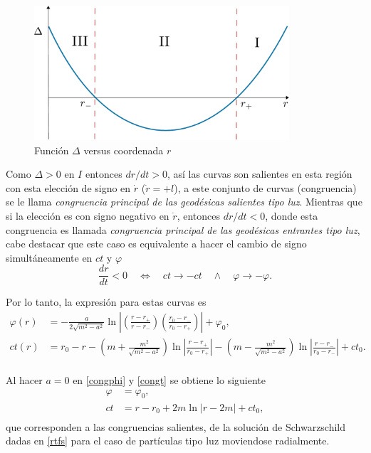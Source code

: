 \begin{figure}[H]
 \centering
\includegraphics[height=5cm,angle=0]{fig/fig-delta.pdf}
\caption{Funci\'on $\Delta$ versus coordenada $r$}
\label{fig:delta}
\end{figure}

Como $\Delta >0$ en $I$ entonces $dr/dt>0$, as\'i las curvas son salientes en esta regi\'on con esta elecci\'on de signo en $\dot{r}$ ($\dot{r}=+l$),  a este conjunto de curvas (congruencia) se le llama \textit{congruencia principal de las geod\'esicas salientes tipo luz}. Mientras que si la elecci\'on es con signo negativo en $\dot{r}$, entonces $dr/dt<0$, donde esta congruencia es llamada \textit{congruencia principal de las geod\'esicas entrantes tipo luz}, cabe destacar que este caso es equivalente a hacer el cambio de signo simult\'aneamente en $ct$ y $\varphi$
\begin{equation}
\frac{dr}{dt}<0 \quad \Longleftrightarrow \quad ct \rightarrow -ct \quad \wedge \quad \varphi \rightarrow -\varphi .
\end{equation}

Por lo tanto, la expresi\'on para estas curvas es
\begin{equation}
\begin{aligned}
\varphi(r)&=-\frac{a}{2\sqrt{m^2-a^2}}\ln \left|\left(\frac{r-r_+}{r-r_-}\right)\left(\frac{r_0-r_-}{r_0-r_+} \right)\right| + \varphi_0 ,\\
ct(r)&=r_0-r-\left(m+\frac{m^2}{\sqrt{m^2-a^2}} \right)\ln\left|\frac{r-r_+}{r_0-r_+}\right|-\left(m-\frac{m^2}{\sqrt{m^2-a^2}} \right)\ln \left|\frac{r-r_-}{r_0-r_-}\right|+ct_0.\\
\end{aligned}
\end{equation}

Al hacer $a=0$ en \eqref{congphi} y \eqref{congt} se obtiene lo siguiente
\begin{equation}
\begin{aligned}
\varphi &=\varphi_0 ,\\
ct&=r-r_0+2m\ln|r-2m|+ct_0,\\
\end{aligned}
\end{equation}
que corresponden a las congruencias salientes, de la soluci\'on de Schwarzschild dadas en \eqref{rtfs} para el caso de part\'iculas tipo luz moviendose radialmente.\\

